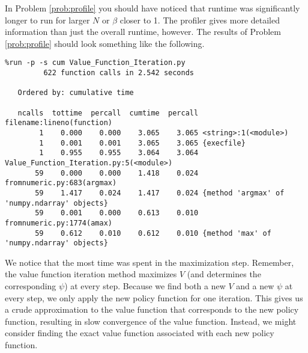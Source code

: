 In Problem \ref{prob:profile} you should have noticed that runtime was significantly longer to run for larger $N$ or $\beta$ closer to 1.  The profiler gives more detailed information than just the overall runtime, however.  The results of Problem \ref{prob:profile} should look something like the following.
\begin{verbatim}
%run -p -s cum Value_Function_Iteration.py
         622 function calls in 2.542 seconds
         
   Ordered by: cumulative time

   ncalls  tottime  percall  cumtime  percall filename:lineno(function)
        1    0.000    0.000    3.065    3.065 <string>:1(<module>)
        1    0.001    0.001    3.065    3.065 {execfile}
        1    0.955    0.955    3.064    3.064 Value_Function_Iteration.py:5(<module>)
       59    0.000    0.000    1.418    0.024 fromnumeric.py:683(argmax)
       59    1.417    0.024    1.417    0.024 {method 'argmax' of 'numpy.ndarray' objects}
       59    0.001    0.000    0.613    0.010 fromnumeric.py:1774(amax)
       59    0.612    0.010    0.612    0.010 {method 'max' of 'numpy.ndarray' objects}
\end{verbatim}
We notice that the most time was spent in the maximization step.  Remember, the value function iteration method maximizes $V$ (and determines the corresponding $\psi$) at every step.  Because we find both a new $V$ and a new $\psi$ at every step, we only apply the new policy function for one iteration.  This gives us a crude approximation to the value function that corresponds to the new policy function, resulting in slow convergence of the value function.  Instead, we might consider finding the exact value function associated with each new policy function.  

